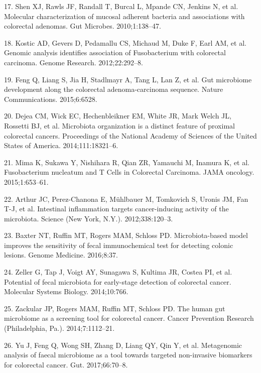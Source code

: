 \documentclass[12pt,]{article}
\begin{document}
\hypertarget{ref-shen_molecular_2010}{}
17. Shen XJ, Rawls JF, Randall T, Burcal L, Mpande CN, Jenkins N, et al.
Molecular characterization of mucosal adherent bacteria and associations
with colorectal adenomas. Gut Microbes. 2010;1:138--47.

\hypertarget{ref-kostic_genomic_2012}{}
18. Kostic AD, Gevers D, Pedamallu CS, Michaud M, Duke F, Earl AM, et
al. Genomic analysis identifies association of Fusobacterium with
colorectal carcinoma. Genome Research. 2012;22:292--8.

\hypertarget{ref-feng_gut_2015}{}
19. Feng Q, Liang S, Jia H, Stadlmayr A, Tang L, Lan Z, et al. Gut
microbiome development along the colorectal adenoma-carcinoma sequence.
Nature Communications. 2015;6:6528.

\hypertarget{ref-dejea_microbiota_2014}{}
20. Dejea CM, Wick EC, Hechenbleikner EM, White JR, Mark Welch JL,
Rossetti BJ, et al. Microbiota organization is a distinct feature of
proximal colorectal cancers. Proceedings of the National Academy of
Sciences of the United States of America. 2014;111:18321--6.

\hypertarget{ref-mima_fusobacterium_2015}{}
21. Mima K, Sukawa Y, Nishihara R, Qian ZR, Yamauchi M, Inamura K, et
al. Fusobacterium nucleatum and T Cells in Colorectal Carcinoma. JAMA
oncology. 2015;1:653--61.

\hypertarget{ref-arthur_intestinal_2012}{}
22. Arthur JC, Perez-Chanona E, Mühlbauer M, Tomkovich S, Uronis JM, Fan
T-J, et al. Intestinal inflammation targets cancer-inducing activity of
the microbiota. Science (New York, N.Y.). 2012;338:120--3.

\hypertarget{ref-baxter_microbiota-based_2016}{}
23. Baxter NT, Ruffin MT, Rogers MAM, Schloss PD. Microbiota-based model
improves the sensitivity of fecal immunochemical test for detecting
colonic lesions. Genome Medicine. 2016;8:37.

\hypertarget{ref-zeller_potential_2014}{}
24. Zeller G, Tap J, Voigt AY, Sunagawa S, Kultima JR, Costea PI, et al.
Potential of fecal microbiota for early-stage detection of colorectal
cancer. Molecular Systems Biology. 2014;10:766.

\hypertarget{ref-zackular_human_2014}{}
25. Zackular JP, Rogers MAM, Ruffin MT, Schloss PD. The human gut
microbiome as a screening tool for colorectal cancer. Cancer Prevention
Research (Philadelphia, Pa.). 2014;7:1112--21.

\hypertarget{ref-yu_metagenomic_2017}{}
26. Yu J, Feng Q, Wong SH, Zhang D, Liang QY, Qin Y, et al. Metagenomic
analysis of faecal microbiome as a tool towards targeted non-invasive
biomarkers for colorectal cancer. Gut. 2017;66:70--8.
\end{document}
